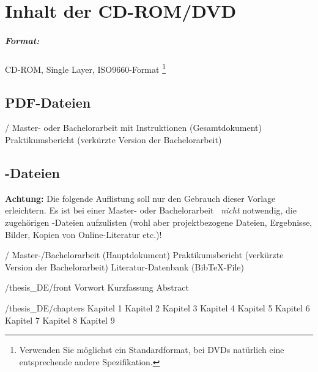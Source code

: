 \chapter{Inhalt der CD-ROM/DVD}
\label{app:cdrom}

\paragraph{Format:} 
		CD-ROM, Single Layer, ISO9660-Format%
\footnote{Verwenden Sie möglichst ein Standardformat, bei DVDs natürlich
eine entsprechende andere Spezifikation.}


\section{PDF-Dateien}
\begin{FileList}{/}
 Master- oder Bachelorarbeit mit Instruktionen (Gesamtdokument)
 Praktikumsbericht (verkürzte Version der Bachelorarbeit) %
\end{FileList}


\section{\latex-Dateien}

\textbf{Achtung:} Die folgende Auflistung soll nur den Gebrauch dieser Vorlage erleichtern. Es ist bei einer Master- oder Bachelorarbeit \ia\ \emph{nicht} notwendig, die zugehörigen \latex-Dateien aufzulisten (wohl aber projektbezogene Dateien, Ergebnisse, Bilder, Kopien von Online-Literatur etc.)!

\begin{FileList}{/}
 Master-/Bachelorarbeit (Hauptdokument) %
 Praktikumsbericht (verkürzte Version der Bachelorarbeit) %
 Literatur-Datenbank (BibTeX-File)
\end{FileList}

\begin{FileList}{/thesis_DE/front}
 Vorwort %
 Kurzfassung %
 Abstract %
\end{FileList}

\begin{FileList}{/thesis_DE/chapters}
 Kapitel 1 %
 Kapitel 2 %
 Kapitel 3
 Kapitel 4 %
 Kapitel 5 %
 Kapitel 6 %
 Kapitel 7 %
 Kapitel 8 %
 Kapitel 9 %
\end{FileList}

